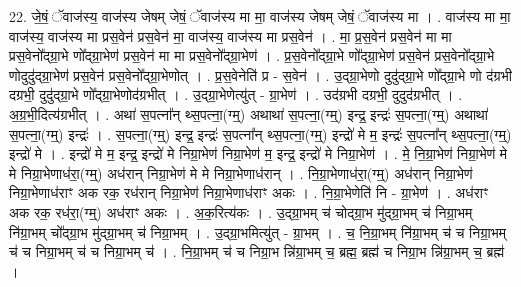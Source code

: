 \documentclass[17pt]{extarticle}
\begin{document}
22. जे॒षं॒ ॅवाज॑स्य॒ वाज॑स्य जेषम् जेषं॒ ॅवाज॑स्य मा मा॒ वाज॑स्य जेषम् जेषं॒ ॅवाज॑स्य मा । . वाज॑स्य मा मा॒ वाज॑स्य॒ वाज॑स्य मा प्रस॒वेन॑ प्रस॒वेन॑ मा॒ वाज॑स्य॒ वाज॑स्य मा प्रस॒वेन॑ । . मा॒ प्र॒स॒वेन॑ प्रस॒वेन॑ मा मा प्रस॒वेनो᳚द्ग्रा॒भे णो᳚द्ग्रा॒भेण॑ प्रस॒वेन॑ मा मा प्रस॒वेनो᳚द्ग्रा॒भेण॑ । . प्र॒स॒वेनो᳚द्ग्रा॒भे णो᳚द्ग्रा॒भेण॑ प्रस॒वेन॑ प्रस॒वेनो᳚द्ग्रा॒भे णोदुदु॑द्ग्रा॒भेण॑ प्रस॒वेन॑ प्रस॒वेनो᳚द्ग्रा॒भेणोत् । . प्र॒स॒वेनेति॑ प्र - स॒वेन॑ । . उ॒द्ग्रा॒भेणो दुदु॑द्ग्रा॒भे णो᳚द्ग्रा॒भे णो द॑ग्रभी दग्रभी॒ दुदु॑द्ग्रा॒भे णो᳚द्ग्रा॒भेणोद॑ग्रभीत् । . उ॒द्ग्रा॒भेणेत्यु॑त् - ग्रा॒भेण॑ । . उद॑ग्रभी दग्रभी॒ दुदुद॑ग्रभीत् । . अ॒ग्र॒भी॒दित्य॑ग्रभीत् । . अथा॑ स॒पत्ना᳚न् थ्स॒पत्ना॒(ग्म्॒) अथाथा॑ स॒पत्ना॒(ग्म्॒) इन्द्र॒ इन्द्रः॑ स॒पत्ना॒(ग्म्॒) अथाथा॑ स॒पत्ना॒(ग्म्॒) इन्द्रः॑ । . स॒पत्ना॒(ग्म्॒) इन्द्र॒ इन्द्रः॑ स॒पत्ना᳚न् थ्स॒पत्ना॒(ग्म्॒) इन्द्रो॑ मे म॒ इन्द्रः॑ स॒पत्ना᳚न् थ्स॒पत्ना॒(ग्म्॒) इन्द्रो॑ मे । . इन्द्रो॑ मे म॒ इन्द्र॒ इन्द्रो॑ मे निग्रा॒भेण॑ निग्रा॒भेण॑ म॒ इन्द्र॒ इन्द्रो॑ मे निग्रा॒भेण॑ । . मे॒ नि॒ग्रा॒भेण॑ निग्रा॒भेण॑ मे मे निग्रा॒भेणाध॑रा॒(ग्म्॒) अध॑रान् निग्रा॒भेण॑ मे मे निग्रा॒भेणाध॑रान् । . नि॒ग्रा॒भेणाध॑रा॒(ग्म्॒) अध॑रान् निग्रा॒भेण॑ निग्रा॒भेणाध॑राꣳ अक रक॒ रध॑रान् निग्रा॒भेण॑ निग्रा॒भेणाध॑राꣳ अकः । . नि॒ग्रा॒भेणेति॑ नि - ग्रा॒भेण॑ । . अध॑राꣳ अक रक॒ रध॑रा॒(ग्म्॒) अध॑राꣳ अकः । . अ॒क॒रित्य॑कः । . उ॒द्ग्रा॒भम् च॑ चोद्ग्रा॒भ मु॑द्ग्रा॒भम् च॑ निग्रा॒भम् नि॑ग्रा॒भम् चो᳚द्ग्रा॒भ मु॑द्ग्रा॒भम् च॑ निग्रा॒भम् । . उ॒द्ग्रा॒भमित्यु॑त् - ग्रा॒भम् । . च॒ नि॒ग्रा॒भम् नि॑ग्रा॒भम् च॑ च निग्रा॒भम् च॑ च निग्रा॒भम् च॑ च निग्रा॒भम् च॑ । . नि॒ग्रा॒भम् च॑ च निग्रा॒भ न्नि॑ग्रा॒भम् च॒ ब्रह्म॒ ब्रह्म॑ च निग्रा॒भ न्नि॑ग्रा॒भम् च॒ ब्रह्म॑ । \newline
\end{document}
